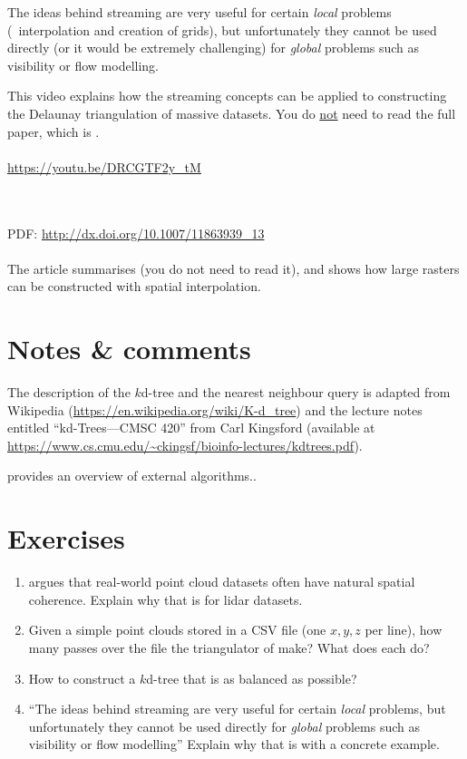 The ideas behind streaming are very useful for certain \emph{local} problems (\eg\ interpolation and creation of grids), but unfortunately they cannot be used directly (or it would be extremely challenging) for \emph{global} problems such as visibility or flow modelling.

\begin{kaobox}[frametitle=\faExternalLink\ To read or to watch.]
  This video explains how the streaming concepts can be applied to constructing the Delaunay triangulation of massive datasets.
  You do \underline{not} need to read the full paper, which is \citet{Isenburg06}.
  \\ \\
  \url{https://youtu.be/DRCGTF2y_tM}
\end{kaobox}

\begin{kaobox}[frametitle=\faExternalLink\ To read or to watch.]
  \\ \\
  PDF: \url{http://dx.doi.org/10.1007/11863939_13}
  \\ \\
  The article summarises \citet{Isenburg06} (you do not need to read it), and shows how large rasters can be constructed with spatial interpolation.
\end{kaobox}


%
\section{Notes \& comments}

The description of the $k$d-tree and the nearest neighbour query is adapted from Wikipedia (\url{https://en.wikipedia.org/wiki/K-d_tree}) and the lecture notes entitled ``kd-Trees---CMSC 420'' from Carl Kingsford (available at \url{https://www.cs.cmu.edu/~ckingsf/bioinfo-lectures/kdtrees.pdf}).

\citet{Vitter01} provides an overview of external algorithms..


%
\section{Exercises}

\begin{enumerate}
  \item \citet{Isenburg06-1} argues that real-world point cloud datasets often have natural spatial coherence. Explain why that is for lidar datasets.
  \item Given a simple point clouds stored in a CSV file (one $x,y,z$ per line), how many passes over the file the triangulator of \citet{Isenburg06-1} make? What does each do?
  \item How to construct a $k$d-tree that is as balanced as possible?
  \item ``The ideas behind streaming are very useful for certain \emph{local} problems, but unfortunately they cannot be used directly for \emph{global} problems such as visibility or flow modelling'' Explain why that is with a concrete example.
\end{enumerate}
